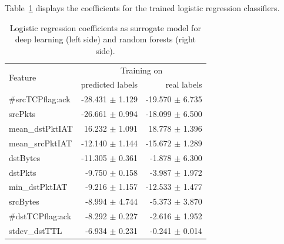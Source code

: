 \documentclass[sigconf,nonacm]{acmart}
\begin{document}
 Table~\ref{tab:logreg_coeff} displays the coefficients for the trained logistic regression classifiers.
 
 \begin{table}
 \caption{Logistic regression coefficients as surrogate model for deep learning (left side) and random forests (right side).} \label{tab:logreg_coeff}
\begin{tabular}{l r r} \toprule 
\multirow{2}{*}{Feature} & \multicolumn{2}{c}{Training on} \\
  & predicted labels & real labels \\ \midrule
    \#srcTCPflag:ack &  -28.431 $\pm$ 1.129 &  -19.570 $\pm$ 6.735 \\
             srcPkts &  -26.661 $\pm$ 0.994 &  -18.099 $\pm$ 6.500 \\
     mean\_dstPktIAT &   16.232 $\pm$ 1.091 &   18.778 $\pm$ 1.396 \\
     mean\_srcPktIAT &  -12.140 $\pm$ 1.144 &  -15.672 $\pm$ 1.289 \\
            dstBytes &  -11.305 $\pm$ 0.361 &   -1.878 $\pm$ 6.300 \\
             dstPkts &   -9.750 $\pm$ 0.158 &   -3.987 $\pm$ 1.972 \\
      min\_dstPktIAT &   -9.216 $\pm$ 1.157 &  -12.533 $\pm$ 1.477 \\
            srcBytes &   -8.994 $\pm$ 4.744 &   -5.373 $\pm$ 3.870 \\
    \#dstTCPflag:ack &   -8.292 $\pm$ 0.227 &   -2.616 $\pm$ 1.952 \\
       stdev\_dstTTL &   -6.934 $\pm$ 0.231 &   -0.241 $\pm$ 0.014 \\

\end{tabular}
\end{table}
\end{document}
